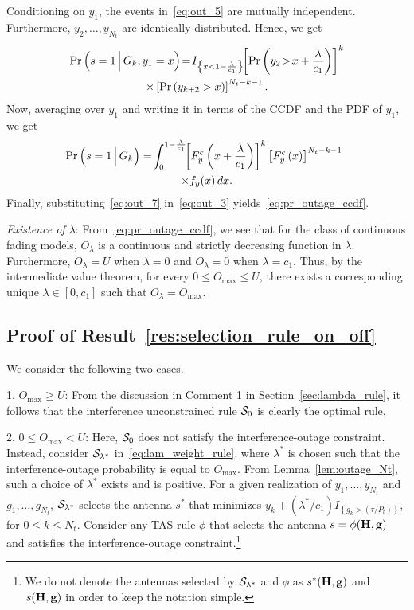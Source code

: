 \documentclass[journal]{IEEEtran}
\newcommand{\brac}[1]{\left({#1}\right)}
\newcommand{\cbrac}[1]{\left\{{#1}\right\}}
\newcommand{\indic}[1]{I_{\cbrac{#1}}}
\newcommand{\mtx}[1]{{\bf #1}} %
\newcommand{\Given}{\Big\arrowvert}
\newcommand{\setG}{G}
\newcommand{\setGk}{\setG_k}
\newcommand{\lam}{\lambda}
\newcommand{\lamstar}{\lam^{*}}
\newcommand{\sstar}{s^{*}}
\newcommand{\Nt}{{N_t}}
\newcommand{\Pt}{{P_t}}
\newcommand{\puch}{g}
\newcommand{\gk}[1]{{\puch_{#1}}}
\newcommand{\g}{\mathbf{\puch}}
\newcommand{\outmax}{O_{\text{max}}}
\newcommand{\itau}{\tau}
\newcommand{\cone}{c_{1}}
\newcommand{\out}{O}
\newcommand{\taubyptinl}{{\itau}/{\Pt}}
\newcommand{\gkgrtaubyptinl}[1]{{\gk{#1}}>\left( \taubyptinl \right) }
\newcommand{\gindicinl}[1]{\indic{\gkgrtaubyptinl{#1}}}
\newcommand{\lambycone}{\frac{\lam}{\cone}}
\newcommand{\yk}[1]{y_{#1}}
\newcommand{\un}{U}
\newcommand{\asrule}{\phi}
\newcommand{\Hmx}{\mtx{H}}
\newcommand{\caluncons}{{\cal S_{\text{0}}}}
\newcommand{\outlam}{\out_{\lam}}
\newcommand{\callamstarrule}{\cal S_{\lam^{*}}}
\begin{document}
Conditioning on $\yk{1}$, the events in~\eqref{eq:out_5} are mutually independent. Furthermore, $\yk{2},\ldots,\yk{\Nt} $ are identically distributed. Hence, we get
%
\begin{multline}
\text{Pr}\brac{s=1\Given \setGk, \yk{1}=x}\!=\! \indic{x<1-\lambycone}\!\!\left[\text{Pr}\brac{\yk{2}\!>\!x+\lambycone}\right]^{k} \\\times \left[\text{Pr}\brac{\yk{k+2}>x}\right]^{\Nt-k-1}.
\label{eq:out_6}
\end{multline}
%
Now, averaging over $\yk{1}$ and writing it in terms of the CCDF and the PDF of $\yk{1}$, we get 
\begin{multline}
\!\!\!\text{Pr}\brac{s=1\Given\setGk} =\!\int_{0}^{1-\lambycone}\!\!\left[F_{y}^{c}\left(x+\lambycone\right)\right]^{k} \left[F_{y}^{c}\left(x\right)\right]^{\Nt-k-1}\\\times f_{y}(x)\,dx.
\label{eq:out_7}
\end{multline}
Finally, substituting~\eqref{eq:out_7} in~\eqref{eq:out_3} yields~\eqref{eq:pr_outage_ccdf}. 

{\em Existence of $\lam$}: From~\eqref{eq:pr_outage_ccdf}, we see that for the class of continuous fading models, $\outlam$ is a continuous and strictly decreasing  function in $\lam$. Furthermore, $\outlam=\un$ when $\lam=0$ and $\outlam=0$ when $\lam=\cone$. Thus, by the intermediate value theorem, for every $0\leq\outmax\leq\un$,  there exists a corresponding unique $\lam\in[0,\cone]$ such that $\outlam=\outmax$. 
  



\subsection{Proof of Result~\ref{res:selection_rule_on_off}}
\label{proof:selection_rule_on_off}

We consider the following two cases.

{ 1. $\outmax\geq\un$:} From the discussion in Comment 1 in Section~\ref{sec:lambda_rule}, it follows that the interference unconstrained rule $\caluncons$ is clearly the optimal rule. 

{2. $0\leq\outmax<\un$:} Here, $\caluncons$ does not satisfy the interference-outage constraint. Instead, consider $\callamstarrule$ in~\eqref{eq:lam_weight_rule}, where $\lamstar$ is chosen such that the interference-outage probability is equal to $\outmax$. From Lemma~\ref{lem:outage_Nt}, such a choice of $\lamstar$ exists and is positive. For a given realization of $\yk{1},\ldots,\yk{\Nt}$ and $\gk{1},\ldots,\gk{\Nt}$,   $\callamstarrule$ selects the antenna $\sstar$ that minimizes $\yk{k} + \left( {\lamstar}/{\cone}\right) \gindicinl{k}$, for $0\leq k\leq\Nt$.  Consider any TAS rule $\asrule$ that selects the antenna  $s=\phi(\Hmx,\g)$ and satisfies the interference-outage constraint.\footnote{We do not denote the antennas selected by $\callamstarrule$ and $\phi$ as $s^*(\Hmx,\g)$ and $s(\Hmx,\g)$ in order to keep the notation simple.} 
\end{document}
